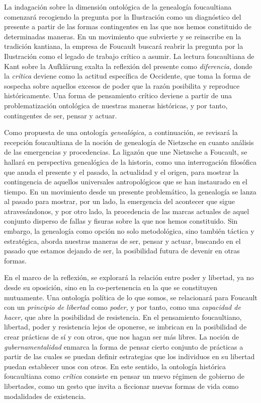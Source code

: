\documentclass{book}
\begin{document}
La indagación sobre la dimensión ontológica de la genealogía
foucaultiana comenzará recogiendo la pregunta por la Ilustración como un
diagnóstico del presente a partir de las formas contingentes en las que
nos hemos constituido de determinadas maneras. En un movimiento que
subvierte y se reinscribe en la tradición kantiana, la empresa de
Foucault buscará reabrir la pregunta por la Ilustración como el legado
de trabajo crítico a asumir. La lectura foucaultiana de Kant sobre la
Aufklärung exalta la reflexión del presente como \emph{diferencia,}
donde la \emph{crítica} deviene como la actitud específica de Occidente,
que toma la forma de sospecha sobre aquellos excesos de poder que la
razón posibilita y reproduce históricamente. Una forma de pensamiento
crítico deviene a partir de una problematización ontológica de nuestras
maneras históricas, y por tanto, contingentes de ser, pensar y actuar.

Como propuesta de una ontología \emph{genealógica,} a continuación, se
revisará la recepción foucaultiana de la noción de genealogía de
Nietzsche en cuanto análisis de las emergencias y procedencias. La
ligazón que une Nietzsche a Foucault, se hallará en perspectiva
genealógica de la historia, como una interrogación filosófica que anuda
el presente y el pasado, la actualidad y el origen, para mostrar la
contingencia de aquellos universales antropológicos que se han
instaurado en el tiempo. En un movimiento desde un presente
problemático, la genealogía se lanza al pasado para mostrar, por un
lado, la emergencia del acontecer que sigue atravesándonos, y por otro
lado, la procedencia de las marcas actuales de aquel conjunto disperso
de fallas y fisuras sobre la que nos hemos constituido. Sin embargo, la
genealogía como opción no solo metodológica, sino también táctica y
estratégica, aborda nuestras maneras de ser, pensar y actuar, buscando
en el pasado que estamos dejando de ser, la posibilidad futura de
devenir en otras formas.

En el marco de la reflexión, se explorará la relación entre poder y
libertad, ya no desde su oposición, sino en la co-pertenencia en la que
se constituyen mutuamente. Una ontología política de lo que somos, se
relacionará para Foucault con un \emph{principio de libertad} como
\emph{poder,} y por tanto, como una \emph{capacidad de hacer,} que abre
la posibilidad de resistencia. En el pensamiento foucaultiano, libertad,
poder y resistencia lejos de oponerse, se imbrican en la posibilidad de
crear prácticas de sí y con otros, que nos hagan ser más libres. La
noción de \emph{gubernamentalidad} enmarca la forma de pensar cierto
conjunto de prácticas a partir de las cuales se puedan definir
estrategias que los individuos en su libertad puedan establecer unos con
otros. En este sentido, la ontología histórica foucaultiana como
\emph{crítica} consiste en pensar un nuevo régimen de gobierno de
libertades, como un gesto que invita a ficcionar nuevas formas de vida
como modalidades de existencia.
\end{document}
